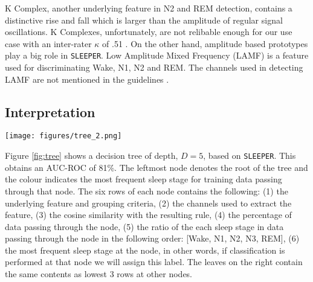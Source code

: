 \documentclass[pmlr]{jmlr}
\newcommand{\mname}
{\texttt{SLEEPER}\xspace}
\begin{document}
K Complex, another underlying feature in N2 and REM detection, contains a distinctive rise and fall which is larger than the amplitude of regular signal oscillations. K Complexes, unfortunately, are not relibable enough for our use case with an inter-rater $\kappa$ of .51 \citep{kcomplexkappa}. On the other hand, amplitude based prototypes play a big role in \mname. Low Amplitude Mixed Frequency (LAMF) is a feature used for discriminating Wake, N1, N2 and REM. The channels used in detecting LAMF are not mentioned in the guidelines \citep{berry2012aasm}. 




\subsection{Interpretation} \label{sec:interpretation}

\begin{figure*}[htb]
 \begin{minipage}{\textwidth}
    \centering
    \texttt{[image: figures/tree\_2.png]}
    \caption[tmp LOF]{\mname-Decision Tree trained from the ISRUC dataset {\let\thefootnote\relax{}}} 
    \label{fig:tree}
\end{minipage}
\end{figure*}
Figure \ref{fig:tree} shows a decision tree of depth, $D=5$, based on \mname. This obtains an AUC-ROC of 81\%. The leftmost node denotes the root of the tree and the colour indicates the most frequent sleep stage for training data passing through that node. The six rows of each node contains the following: (1) the underlying feature and grouping criteria, (2) the channels used to extract the feature, (3) the cosine similarity with the resulting rule, (4) the percentage of data passing through the node, (5) the ratio of the each sleep stage in data passing through the node in the following order: [Wake, N1, N2, N3, REM], (6) the most frequent sleep stage at the node, in other words, if classification is performed at that node we will assign this label. The leaves on the right contain the same contents as lowest 3 rows at other nodes. 
\end{document}
